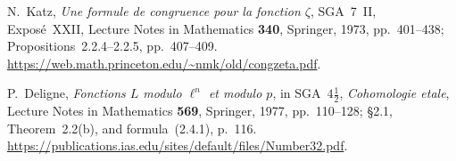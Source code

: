 N.~Katz, \emph{Une formule de congruence pour la fonction
$\zeta$}, SGA~7~II, Expos\'e~XXII, Lecture Notes in
Mathematics \textbf{340}, Springer, 1973, pp.~401--438;
Propositions~2.2.4--2.2.5, pp.~407--409.
\url{https://web.math.princeton.edu/~nmk/old/congzeta.pdf}.

P.~Deligne, \emph{Fonctions $L$ modulo $\ell^n$ et modulo $p$},
in SGA~$4\frac12$, \emph{Cohomologie etale}, Lecture Notes in
Mathematics \textbf{569}, Springer, 1977, pp.~110--128;
\S2.1, Theorem~2.2(b), and formula~(2.4.1), p.~116.
\url{https://publications.ias.edu/sites/default/files/Number32.pdf}.
